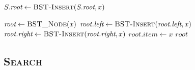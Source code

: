 \begin{minipage}[t]{0.425\linewidth} \begin{algorithm}[H] \begin{algorithmic}[1]
        \State $S.\textit{root} \gets \textsc{BST-Insert}(S.\textit{root}, x)$
    \EndProcedure
\end{algorithmic} \end{algorithm} \end{minipage}
\hfill
\begin{minipage}[t]{0.525\linewidth} \begin{algorithm}[H] \begin{algorithmic}[1]
        \State {}
            \State $\textit{root} \gets \textsc{BST\_Node}(x)$ 
            \State $\textit{root.left} \gets \textsc{BST-Insert}(\textit{root.left}, x)$
            \State $\textit{root.right} \gets \textsc{BST-Insert}(\textit{root.right}, x)$
        \Else {~} 
            \State $\textit{root.item} \gets x$ 
        \EndIf
        \State \Return $\textit{root}$
    \EndProcedure
\end{algorithmic} \end{algorithm} \end{minipage}

\subsection{\textsc{Search}}

